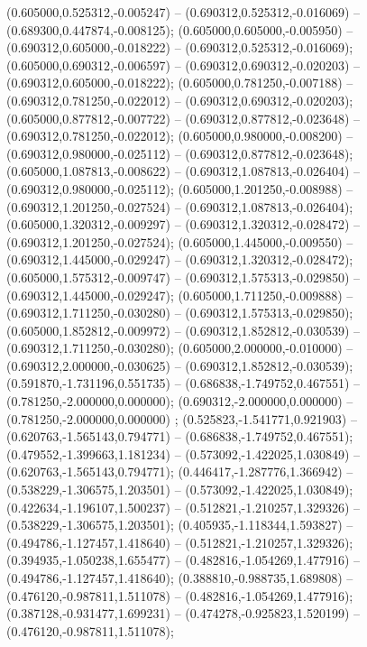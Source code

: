  (0.605000,0.525312,-0.005247) -- (0.690312,0.525312,-0.016069) -- (0.689300,0.447874,-0.008125);
 (0.605000,0.605000,-0.005950) -- (0.690312,0.605000,-0.018222) -- (0.690312,0.525312,-0.016069);
 (0.605000,0.690312,-0.006597) -- (0.690312,0.690312,-0.020203) -- (0.690312,0.605000,-0.018222);
 (0.605000,0.781250,-0.007188) -- (0.690312,0.781250,-0.022012) -- (0.690312,0.690312,-0.020203);
 (0.605000,0.877812,-0.007722) -- (0.690312,0.877812,-0.023648) -- (0.690312,0.781250,-0.022012);
 (0.605000,0.980000,-0.008200) -- (0.690312,0.980000,-0.025112) -- (0.690312,0.877812,-0.023648);
 (0.605000,1.087813,-0.008622) -- (0.690312,1.087813,-0.026404) -- (0.690312,0.980000,-0.025112);
 (0.605000,1.201250,-0.008988) -- (0.690312,1.201250,-0.027524) -- (0.690312,1.087813,-0.026404);
 (0.605000,1.320312,-0.009297) -- (0.690312,1.320312,-0.028472) -- (0.690312,1.201250,-0.027524);
 (0.605000,1.445000,-0.009550) -- (0.690312,1.445000,-0.029247) -- (0.690312,1.320312,-0.028472);
 (0.605000,1.575312,-0.009747) -- (0.690312,1.575313,-0.029850) -- (0.690312,1.445000,-0.029247);
 (0.605000,1.711250,-0.009888) -- (0.690312,1.711250,-0.030280) -- (0.690312,1.575313,-0.029850);
 (0.605000,1.852812,-0.009972) -- (0.690312,1.852812,-0.030539) -- (0.690312,1.711250,-0.030280);
 (0.605000,2.000000,-0.010000) -- (0.690312,2.000000,-0.030625) -- (0.690312,1.852812,-0.030539);
 (0.591870,-1.731196,0.551735) -- (0.686838,-1.749752,0.467551) -- (0.781250,-2.000000,0.000000);
 (0.690312,-2.000000,0.000000) -- (0.781250,-2.000000,0.000000) ;
 (0.525823,-1.541771,0.921903) -- (0.620763,-1.565143,0.794771) -- (0.686838,-1.749752,0.467551);
 (0.479552,-1.399663,1.181234) -- (0.573092,-1.422025,1.030849) -- (0.620763,-1.565143,0.794771);
 (0.446417,-1.287776,1.366942) -- (0.538229,-1.306575,1.203501) -- (0.573092,-1.422025,1.030849);
 (0.422634,-1.196107,1.500237) -- (0.512821,-1.210257,1.329326) -- (0.538229,-1.306575,1.203501);
 (0.405935,-1.118344,1.593827) -- (0.494786,-1.127457,1.418640) -- (0.512821,-1.210257,1.329326);
 (0.394935,-1.050238,1.655477) -- (0.482816,-1.054269,1.477916) -- (0.494786,-1.127457,1.418640);
 (0.388810,-0.988735,1.689808) -- (0.476120,-0.987811,1.511078) -- (0.482816,-1.054269,1.477916);
 (0.387128,-0.931477,1.699231) -- (0.474278,-0.925823,1.520199) -- (0.476120,-0.987811,1.511078);
